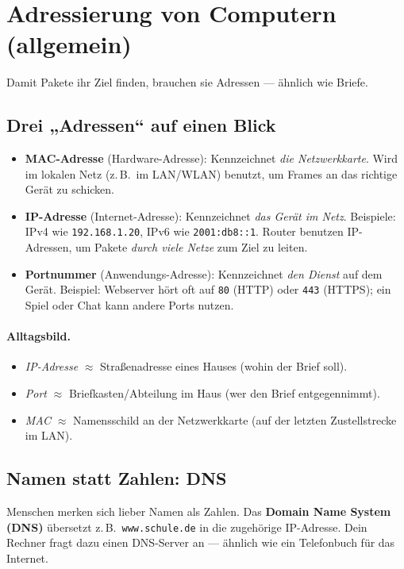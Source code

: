 \documentclass[../skript/main.tex]{subfiles}
\begin{document}
	\section{Adressierung von Computern (allgemein)}\label{sec:adressierung}
	Damit Pakete ihr Ziel finden, brauchen sie Adressen — ähnlich wie Briefe.
	
	\subsection*{Drei „Adressen“ auf einen Blick}
	\begin{itemize}
		\item \textbf{MAC-Adresse} (Hardware-Adresse): Kennzeichnet \emph{die Netzwerkkarte}. Wird im lokalen Netz
		(z.\,B.\ im LAN/WLAN) benutzt, um Frames an das richtige Gerät zu schicken.
		\item \textbf{IP-Adresse} (Internet-Adresse): Kennzeichnet \emph{das Gerät im Netz}. Beispiele:
		IPv4 wie \texttt{192.168.1.20}, IPv6 wie \texttt{2001:db8::1}. Router benutzen IP-Adressen,
		um Pakete \emph{durch viele Netze} zum Ziel zu leiten.
		\item \textbf{Portnummer} (Anwendungs-Adresse): Kennzeichnet \emph{den Dienst} auf dem Gerät.
		Beispiel: Webserver hört oft auf \texttt{80} (HTTP) oder \texttt{443} (HTTPS); ein Spiel oder
		Chat kann andere Ports nutzen.
	\end{itemize}
	
	\paragraph{Alltagsbild.}
	\begin{itemize}
		\item \emph{IP-Adresse} \(\approx\) Straßenadresse eines Hauses (wohin der Brief soll).
		\item \emph{Port} \(\approx\) Briefkasten/Abteilung im Haus (wer den Brief entgegennimmt).
		\item \emph{MAC} \(\approx\) Namensschild an der Netzwerkkarte (auf der letzten Zustellstrecke im LAN).
	\end{itemize}
	
	\subsection*{Namen statt Zahlen: DNS}
	Menschen merken sich lieber Namen als Zahlen. Das \textbf{Domain Name System (DNS)} übersetzt
	z.\,B.\ \texttt{www.schule.de} in die zugehörige IP-Adresse. Dein Rechner fragt dazu einen
	DNS-Server an — ähnlich wie ein Telefonbuch für das Internet.
	
\end{document}
